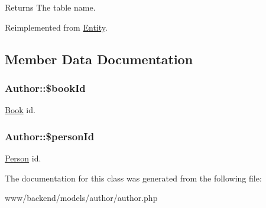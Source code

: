 \begin{DoxyReturn}{Returns}
The table name. 
\end{DoxyReturn}


Reimplemented from \hyperlink{classEntity_a8305fd94740ac62cbafb9de76567ce37}{Entity}.



\subsection{Member Data Documentation}
\hypertarget{classAuthor_a6d4bc8d9eae2f9d89654bece0c0f9522}{
\subsubsection[{\$bookId}]{\setlength{\rightskip}{0pt plus 5cm}Author::\$bookId}}
\label{classAuthor_a6d4bc8d9eae2f9d89654bece0c0f9522}
\hyperlink{classBook}{Book} id. \hypertarget{classAuthor_a628d54cd75c03cfe5c48c38fbabaf391}{
\subsubsection[{\$personId}]{\setlength{\rightskip}{0pt plus 5cm}Author::\$personId}}
\label{classAuthor_a628d54cd75c03cfe5c48c38fbabaf391}
\hyperlink{classPerson}{Person} id. 

The documentation for this class was generated from the following file:\begin{DoxyCompactItemize}
\item 
www/backend/models/author/author.php\end{DoxyCompactItemize}
